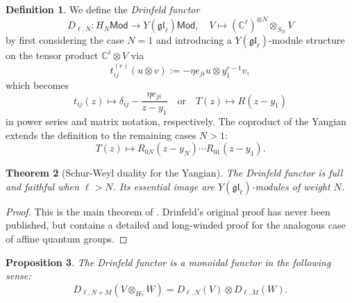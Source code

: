 \documentclass[11pt]{report}
\newtheorem{theorem}{Theorem}[section]
\newtheorem{prop}[theorem]{Proposition}
\theoremstyle{definition}
\newtheorem{definition}[theorem]{Definition}
\theoremstyle{remark}
\theoremstyle{remark}
\newcommand{\C}{\mathbb{C}}
\begin{document}
\begin{definition}
We define the \emph{Drinfeld functor}
\begin{equation*}
D_{\ell,N}: \dot H_N\mathsf{Mod} \to Y(\mathfrak{gl}_\ell)\mathsf{Mod}, \quad V \mapsto (\C^\ell)^{\otimes N} \otimes_{S_N} V
\end{equation*}
by first considering the case $N=1$ and introducing a $Y(\mathfrak{gl}_\ell)$-module structure on the tensor product $\C^\ell \otimes V$ via
\begin{equation*}
t_{ij}^{(r)}(u \otimes v) := -\eta e_{ji} u \otimes y_1^{r-1} v,
\end{equation*}
which becomes
\begin{equation*}
t_{ij}(z) \mapsto \delta_{ij} - \frac{\eta e_{ji}}{z-y_1} \quad \text{or} \quad T(z) \mapsto R(z-y_1)
\end{equation*}
in power series and matrix notation, respectively. The coproduct of the Yangian extends the definition to the remaining cases $N > 1$:
\begin{equation*}
T(z) \mapsto R_{0N}(z-y_N) \cdots R_{01}(z-y_1).
\end{equation*}
\end{definition}

\begin{theorem}[Schur-Weyl duality for the Yangian]
The Drinfeld functor is full and faithful when $\ell > N$. Its essential image are $Y(\mathfrak{gl}_\ell)$-modules of weight $N$.
\end{theorem}

\begin{proof}
This is the main theorem of \cite{article:drinfeld:1986}. Drinfeld's original proof has never been published, but \cite{article:chari:1995} contains a detailed and long-winded proof for the analogous case of affine quantum groups.
\end{proof}

\begin{prop}
The Drinfeld functor is a monoidal functor in the following sense:
\begin{equation*}
D_{\ell,N+M}(V \otimes_{\dot H_*} W) = D_{\ell,N}(V) \otimes D_{\ell,M}(W).
\end{equation*}
\end{prop}
\end{document}

